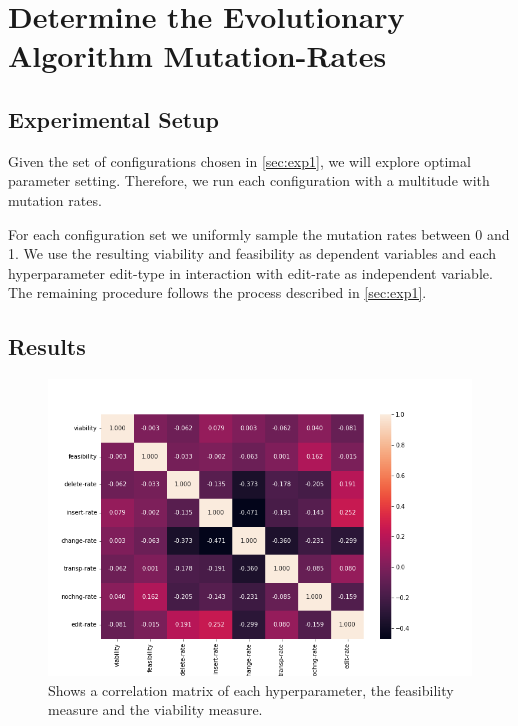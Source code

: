 \documentclass[./../../paper.tex]{subfiles}
\begin{document}
\section{Determine the Evolutionary Algorithm Mutation-Rates}

\subsection{Experimental Setup}
\label{sec:exp2}
Given the set of configurations chosen in \autoref{sec:exp1}, we will explore optimal parameter setting. Therefore, we run each configuration with a multitude with mutation rates.

For each configuration set we uniformly sample the mutation rates between 0 and 1. We use the resulting viability and feasibility as dependent variables and each hyperparameter edit-type in interaction with edit-rate as independent variable. The remaining procedure follows the process described in \autoref{sec:exp1}.


\subsection{Results}

\begin{figure}
    \centering
    \includegraphics[width=\textwidth]{figures/results/params_heatmap.png}
    \caption{Shows a correlation matrix of each hyperparameter, the feasibility measure and the viability measure.}
    \label{fig:param_results_1}
\end{figure}
\end{document}
